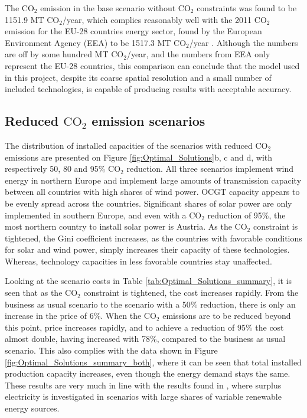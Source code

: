 The $\text{CO}_2$ emission in the base scenario without $\text{CO}_2$ constraints was found to be 1151.9 MT $\text{CO}_2$/year, which complies reasonably well with the 2011 $\text{CO}_2$ emission for the EU-28 countries energy sector, found by the European Environment Agency (EEA) to be 1517.3 MT $\text{CO}_2$/year \cite{eea_co2_emission}. Although the numbers are off by some hundred MT $\text{CO}_2$/year, and the numbers from EEA only represent the EU-28 countries, this comparison can conclude that the model used in this project, despite its coarse spatial resolution and a small number of included technologies, is capable of producing results with acceptable accuracy. 


\subsection{Reduced $\text{CO}_2$ emission scenarios}

The distribution of installed capacities of the scenarios with reduced $\text{CO}_2$ emissions are presented on Figure \ref{fig:Optimal_Solutions}b, c and d, with respectively 50, 80 and 95\% $\text{CO}_2$ reduction. All three scenarios implement wind energy in northern Europe and implement large amounts of transmission capacity between all countries with high shares of wind power. OCGT capacity appears to be evenly spread across the countries. Significant shares of solar power are only implemented in southern Europe, and even with a $\text{CO}_2$ reduction of 95\%, the most northern country to install solar power is Austria. 
As the $\text{CO}_2$ constraint is tightened, the Gini coefficient increases, as the countries with favorable conditions for solar and wind power, simply increases their capacity of these technologies. Whereas, technology capacities in less favorable countries stay unaffected. 

Looking at the scenario costs in Table \ref{tab:Optimal_Solutions_summary}, it is seen that as the $\text{CO}_2$ constraint is tightened, the cost increases rapidly. From the business as usual scenario to the scenario with a 50\% reduction, there is only an increase in the price of 6\%. When the $\text{CO}_2$ emissions are to be reduced beyond this point, price increases rapidly, and to achieve a reduction of 95\% the cost almost double, having increased with 78\%, compared to the business as usual scenario. This also complies with the data shown in Figure \ref{fig:Optimal_Solutions_summary_both}, where it can be seen that total installed production capacity increases, even though the energy demand stays the same. These results are very much in line with the results found in \cite{Gorm_Surplus}, where surplus electricity is investigated in scenarios with large shares of variable renewable energy sources. 

